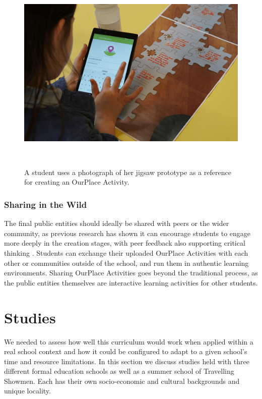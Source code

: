 \documentclass[,hyphens]{sigchi}
\begin{document}
\begin{figure}
\centering
  \includegraphics[width=1\columnwidth]{figures/jigsawToApp}
  \caption{A student uses a photograph of her jigsaw prototype as a reference for creating an OurPlace Activity.}~\label{fig:JigsawToApp}
\end{figure}

\subsubsection{Sharing in the Wild}
The final public entities should ideally be shared with peers or the wider community, as previous research has shown it can encourage students to engage more deeply in the creation stages, with peer feedback also supporting critical thinking \cite{Sarangapani2018}. Students can exchange their uploaded OurPlace Activities with each other or communities outside of the school, and run them in authentic learning environments. Sharing OurPlace Activities goes beyond the traditional process, as the public entities themselves are interactive learning activities for other students.

\section{Studies}
We needed to assess how well this curriculum would work when applied within a real school context and how it could be configured to adapt to a given school's time and resource limitations. In this section we discuss studies held with three different formal education schools as well as a summer school of Travelling Showmen. Each has their own socio-economic and cultural backgrounds and unique locality.
\end{document}
